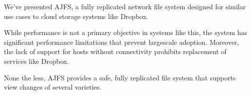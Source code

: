 
We've presented AJFS, a fully replicated network file system designed for
similar use cases to cloud storage systems like Dropbox.

While performance is not a primary objective in systems like this, the system
has significant performance limitations that prevent largescale adoption.
Moreover, the lack of support for hosts without connectivity prohibits
replacement of services like Dropbox.

None the less, AJFS provides a safe, fully replicated file system that supports
view changes of several varieties.

